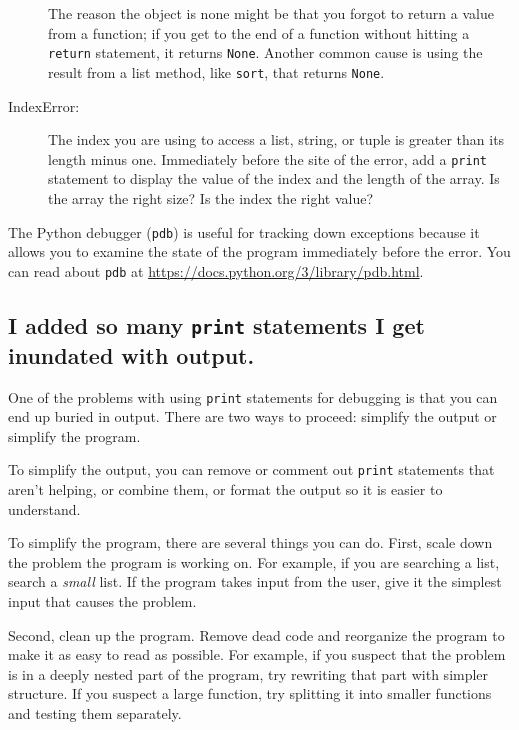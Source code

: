 \begin{description}
The reason the object is none might be that you forgot
to return a value from a function; if you get to the end of
a function without hitting a {\tt return} statement, it returns
{\tt None}.  Another common cause is using the result from
a list method, like {\tt sort}, that returns {\tt None}.

\item[IndexError:] The index you are using
to access a list, string, or tuple is greater than
its length minus one.  Immediately before the site of the error,
add a {\tt print} statement to display
the value of the index and the length of the array.
Is the array the right size?  Is the index the right value?

\end{description}

The Python debugger ({\tt pdb}) is useful for tracking down
exceptions because it allows you to examine the state of the
program immediately before the error.  You can read
about {\tt pdb} at \url{https://docs.python.org/3/library/pdb.html}.


\subsection{I added so many {\tt print} statements I get inundated with
output.}

One of the problems with using {\tt print} statements for debugging
is that you can end up buried in output.  There are two ways
to proceed: simplify the output or simplify the program.

To simplify the output, you can remove or comment out {\tt print}
statements that aren't helping, or combine them, or format
the output so it is easier to understand.

To simplify the program, there are several things you can do.  First,
scale down the problem the program is working on.  For example, if you
are searching a list, search a {\em small} list.  If the program takes
input from the user, give it the simplest input that causes the
problem.

Second, clean up the program.  Remove dead code and reorganize the
program to make it as easy to read as possible.  For example, if you
suspect that the problem is in a deeply nested part of the program,
try rewriting that part with simpler structure.  If you suspect a
large function, try splitting it into smaller functions and testing them
separately.

